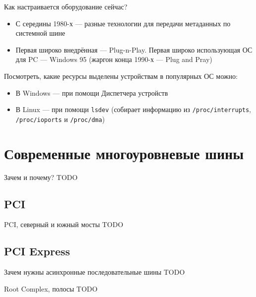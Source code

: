 \documentclass[xetex,aspectratio=43]{beamer}
\begin{document}
\begin{frame}[fragile]{Как настраивается оборудование сейчас?}
	\begin{itemize}
		\item
		С середины 1980-х --- разные технологии для передачи метаданных по
		системной шине
		\item
		Первая широко внедрённая --- Plug-n-Play. Первая широко использующая 			ОС для PC --- Windows 95 (жаргон конца 1990-х --- Plug and Pray)
	\end{itemize}
	
	\pause
	
	Посмотреть, какие ресурсы выделены устройствам в популярных ОС можно:
	
	\begin{itemize}
		\item
		В Windows --- при помощи Диспетчера устройств
		\item
		В Linux --- при помощи \texttt{lsdev} (собирает информацию из
		\texttt{/proc/interrupts}, \texttt{/proc/ioports} и
		\texttt{/proc/dma})
	\end{itemize}
\end{frame}

\section{Современные многоуровневые шины}

\begin{frame}{Зачем и почему?}
	TODO
\end{frame}

\subsection{PCI}

\begin{frame}{PCI, северный и южный мосты}
	TODO
\end{frame}

\subsection{PCI Express}

\begin{frame}{Зачем нужны асинхронные последовательные шины}
	TODO
\end{frame}

\begin{frame}{Root Complex, полосы}
	TODO
\end{frame}
\end{document}
